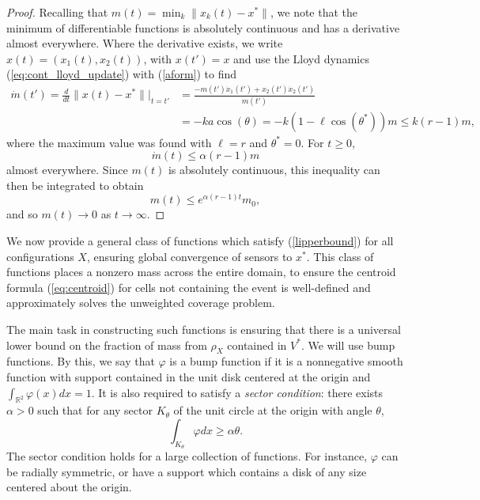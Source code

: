 \documentclass[onefignum,onetabnum]{siamart171218} %
\begin{document}
\begin{proof}
Recalling that $m(t) = \min_{k} \| x_k(t) - x^*\|$, we note that the minimum of differentiable functions is absolutely continuous and has a derivative almost everywhere.  Where the derivative exists, we write $x(t) = (x_1(t), x_2(t))$, with $x(t') = x$ and use the Lloyd dynamics (\ref{eq:cont_lloyd_update}) with (\ref{aform}) to find
\begin{align}
    \dot m(t') = \frac{d}{dt} \|x(t) - x^*\|\Bigr|_{t = t'} &= \frac{-m(t')\dot x_1(t')+ x_2(t') \dot x_2(t')}{m(t')} \\ &= -ka\cos(\theta) =  -k(1 - \ell\cos(\theta^*))m \le k(r-1)m,
\end{align}
where the maximum value was found with $\ell = r$ and $\theta^* = 0$.  For $t \ge 0$, 
\begin{equation}
    \dot m(t)  \le \alpha(r-1) m \label{cron1}
\end{equation}
almost everywhere. Since $m(t)$ is absolutely continuous, this inequality can then be integrated to obtain
\begin{equation}
m(t) \le e^{\alpha(r-1)t }m_0 \label{cron2}, 
\end{equation}
and so $m(t) \rightarrow 0$ as  $t \rightarrow \infty$.
\end{proof}




We now provide a general class of functions which satisfy (\ref{lipperbound}) for all configurations $X$, ensuring global convergence of sensors to $x^*$. 
This class of functions places a nonzero mass across the entire domain, to ensure the centroid formula (\ref{eq:centroid}) for cells not containing the event is well-defined and approximately solves the unweighted coverage problem.

The main task in constructing such functions is ensuring that there is a universal lower bound on the fraction of mass from $\rho_X$ contained in $V^*$.  We will use bump functions.  By this, we say that $\varphi$ is a bump function if it is a nonnegative smooth function with support contained in the unit disk centered at the origin and $\int_{\mathbb R^2} \varphi(x)dx = 1$.  It is also required to satisfy a \textit{sector condition}: there exists $\alpha>0$ such that for any sector $K_\theta$ of the unit circle at the origin with angle $\theta$, 
\begin{equation}
    \int_{K_\theta} \varphi dx \ge \alpha \theta.
\end{equation}
The sector condition holds for a large collection of functions.  For instance, $\varphi$ can be radially symmetric, or have a support which contains a disk of any size centered about the origin. 
\end{document}
